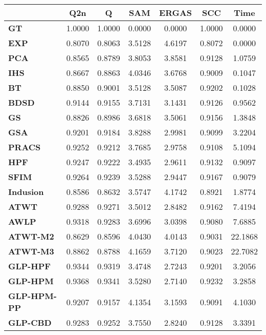 \begin{tabular}{|l|c|c|c|c|c|c|}
\hline
&\textbf{Q2n}&\textbf{Q}&\textbf{SAM}&\textbf{ERGAS}&\textbf{SCC}&\textbf{Time}\\\hline
\textbf{GT}&1.0000&1.0000&0.0000&0.0000&1.0000&0.0000\\\hline
\textbf{EXP}&0.8070&0.8063&3.5128&4.6197&0.8072&0.0000\\\hline
\textbf{PCA}&0.8565&0.8789&3.8053&3.8581&0.9128&1.0759\\\hline
\textbf{IHS}&0.8667&0.8863&4.0346&3.6768&0.9009&0.1047\\\hline
\textbf{BT}&0.8850&0.9001&3.5128&3.5087&0.9202&0.1028\\\hline
\textbf{BDSD}&0.9144&0.9155&3.7131&3.1431&0.9126&0.9562\\\hline
\textbf{GS}&0.8826&0.8986&3.6818&3.5061&0.9156&1.3848\\\hline
\textbf{GSA}&0.9201&0.9184&3.8288&2.9981&0.9099&3.2204\\\hline
\textbf{PRACS}&0.9252&0.9212&3.7685&2.9758&0.9108&5.1094\\\hline
\textbf{HPF}&0.9247&0.9222&3.4935&2.9611&0.9132&0.9097\\\hline
\textbf{SFIM}&0.9264&0.9239&3.5288&2.9447&0.9167&0.9079\\\hline
\textbf{Indusion}&0.8586&0.8632&3.5747&4.1742&0.8921&1.8774\\\hline
\textbf{ATWT}&0.9288&0.9271&3.5012&2.8482&0.9162&7.4194\\\hline
\textbf{AWLP}&0.9318&0.9283&3.6996&3.0398&0.9080&7.6885\\\hline
\textbf{ATWT-M2}&0.8629&0.8596&4.0430&4.0143&0.9031&22.1868\\\hline
\textbf{ATWT-M3}&0.8862&0.8788&4.1659&3.7120&0.9023&22.7082\\\hline
\textbf{GLP-HPF}&0.9344&0.9319&3.4748&2.7243&0.9201&3.2056\\\hline
\textbf{GLP-HPM}&0.9368&0.9341&3.5280&2.7140&0.9232&3.2858\\\hline
\textbf{GLP-HPM-PP}&0.9207&0.9157&4.1354&3.1593&0.9091&4.1030\\\hline
\textbf{GLP-CBD}&0.9283&0.9252&3.7550&2.8240&0.9128&3.3391\\\hline
\end{tabular}

